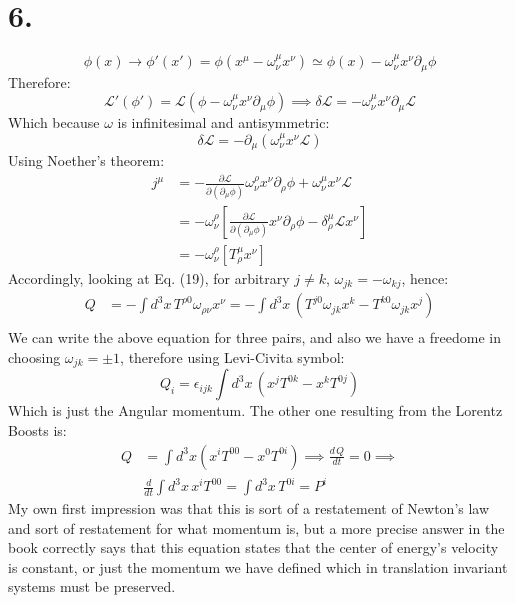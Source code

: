 \documentclass{article}
\newcommand{\pd}{\partial}  %
\newcommand{\pdm}{\partial_\mu}  %
\newcommand{\Lag}{\mathcal{L}}  %
\begin{document}
\section*{6.}
\begin{equation}
    \phi(x) \xrightarrow{} \phi'(x') = \phi(x^\mu - \omega^\mu_\nu x^\nu) \simeq \phi(x) - \omega^\mu_\nu x^\nu \pdm \phi
\end{equation}
Therefore:
\begin{equation}
    \Lag'(\phi') = \Lag(\phi-\omega^\mu_\nu x^\nu \pdm \phi) \implies \delta\Lag = -\omega^\mu_\nu x^\nu \pdm \Lag 
\end{equation}
Which because $\omega$ is infinitesimal and antisymmetric:
\begin{equation}
    \delta\Lag = - \pdm (\omega^\mu_\nu x^\nu \Lag)
\end{equation}
Using Noether's theorem:
\begin{equation}
    \begin{split}
        j^\mu &= -\frac{\pd\Lag}{\pd (\pdm \phi)}\omega^\rho_\nu x^\nu \pd_{\rho} \phi + \omega^\mu_\nu x^\nu \Lag \\
        & = -\omega^\rho_\nu \left[ \frac{\pd\Lag}{\pd (\pdm \phi)} x^\nu \pd_{\rho} \phi - \delta^\mu_\rho\Lag x^\nu \right]\\
        & = -\omega^\rho_\nu \left[ T_\rho^\mu x^\nu \right]
    \end{split}
\end{equation}
Accordingly, looking at Eq. (19), for arbitrary $j\ne k$, $\omega_{jk}=-\omega_{kj}$, hence:
\begin{equation}
    \begin{split}
        Q &= -\int d^3x \, T^{\rho 0}\omega_{\rho\nu}x^\nu = -\int d^3x \, (T^{j 0}\omega_{jk}x^k -T^{k0} \omega_{jk}x^j) \\
    \end{split}
\end{equation}
We can write the above equation for three pairs, and also we have a freedome in choosing $\omega_{jk}=\pm 1$, therefore 
using Levi-Civita symbol:
\begin{equation}
    Q_i = \epsilon_{ijk} \int d^3x \, (x^jT^{0k} - x^kT^{0j})
\end{equation}
Which is just the Angular momentum.
The other one resulting from the Lorentz Boosts is:
\begin{equation}
    \begin{split}
        Q &= \int d^3x (x^iT^{00} - x^0T^{0i}) \implies \frac{d\,Q}{dt} = 0 \implies \\
        & \frac{d}{dt}\int d^3x \, x^iT^{00} = \int d^3x \, T^{0i}  = P^i
    \end{split}
\end{equation}
My own first impression was that this is sort of a restatement of Newton's law and sort of restatement
for what momentum is, but a more precise answer in the book correctly says that this equation states 
that the center of energy's velocity is constant, or just the momentum we have defined which in 
translation invariant systems must be preserved.
\end{document}
